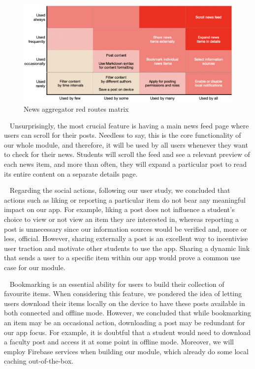 \begin{figure}[ht]
    \centering
    \includegraphics[width=\textwidth]{figures/app/miscellanous/red-routes-map.png}
    \caption{News aggregator red routes matrix}
    \label{3:fig:students_organizations}
\end{figure}

~
Unsurprisingly, the most crucial feature is having a main news feed page where users can scroll for their posts. Needless to say, this is the core functionality of our whole module, and therefore, it will be used by all users whenever they want to check for their news. Students will scroll the feed and see a relevant preview of each news item, and more than often, they will expand a particular post to read its entire content on a separate details page.

~
Regarding the social actions, following our user study, we concluded that actions such as liking or reporting a particular item do not bear any meaningful impact on our app. For example, liking a post does not influence a student's choice to view or not view an item they are interested in, whereas reporting a post is unnecessary since our information sources would be verified and, more or less, official. However, sharing externally a post is an excellent way to incentivise user traction and motivate other students to use the app. Sharing a dynamic link that sends a user to a specific item within our app would prove a common use case for our module.

~
Bookmarking is an essential ability for users to build their collection of favourite items. When considering this feature, we pondered the idea of letting users download their items locally on the device to have these posts available in both connected and offline mode. However, we concluded that while bookmarking an item may be an occasional action, downloading a post may be redundant for our app focus. For example, it is doubtful that a student would need to download a faculty post and access it at some point in offline mode. Moreover, we will employ Firebase services when building our module, which already do some local caching out-of-the-box.

